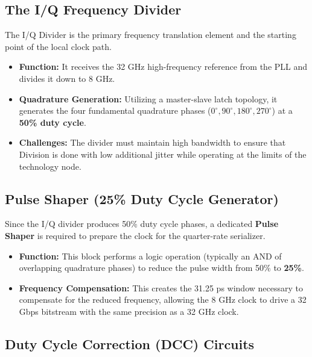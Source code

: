 \documentclass[12pt, a4paper]{report}
\begin{document}
\subsection{The I/Q Frequency Divider}
\label{subsec:iq-divider}

The I/Q Divider is the primary frequency translation element and the starting point of the local clock path.

\begin{itemize}
    \item \textbf{Function:} It receives the 32 GHz high-frequency reference from the PLL and divides it down to 8 GHz.
    
    \item \textbf{Quadrature Generation:} Utilizing a master-slave latch topology, it generates the four fundamental quadrature phases (\(0^\circ, 90^\circ, 180^\circ, 270^\circ\)) at a \textbf{50\% duty cycle}.
    
    \item \textbf{Challenges:} The divider must maintain high bandwidth to ensure that Division is done with low additional  jitter while operating at the limits of the technology node.
\end{itemize}

\subsection{Pulse Shaper (25\% Duty Cycle Generator)}
\label{subsec:pulse-shaper}

Since the I/Q divider produces 50\% duty cycle phases, a dedicated \textbf{Pulse Shaper} is required to prepare the clock for the quarter-rate serializer.

\begin{itemize}
    \item \textbf{Function:} This block performs a logic operation (typically an AND of overlapping quadrature phases) to reduce the pulse width from 50\% to \textbf{25\%}.
    
    \item \textbf{Frequency Compensation:} This creates the 31.25 ps window necessary to compensate for the reduced frequency, allowing the 8 GHz clock to drive a 32 Gbps bitstream with the same precision as a 32 GHz clock.
\end{itemize}

\subsection{Duty Cycle Correction (DCC) Circuits}
\label{subsec:dcc-circuits}
\end{document}
